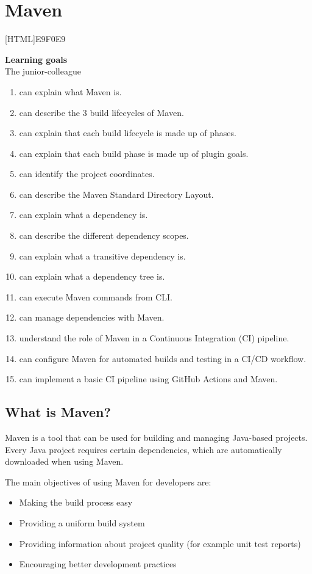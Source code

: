 \chapter{Maven}
\label{chap:maven}

[HTML]{E9F0E9}{\parbox{\textwidth}{%
\noindent \textbf{Learning goals}\\
The junior-colleague
\begin{enumerate}[nolistsep]
\item can explain what Maven is.
\item can describe the 3 build lifecycles of Maven.
\item can explain that each build lifecycle is made up of phases.
\item can explain that each build phase is made up of plugin goals.
\item can identify the project coordinates.
\item can describe the Maven Standard Directory Layout.
\item can explain what a dependency is.
\item can describe the different dependency scopes.
\item can explain what a transitive dependency is.
\item can explain what a dependency tree is.
\item can execute Maven commands from CLI.
\item can manage dependencies with Maven.
\item understand the role of Maven in a Continuous Integration (CI) pipeline.
\item can configure Maven for automated builds and testing in a CI/CD workflow.
\item can implement a basic CI pipeline using GitHub Actions and Maven.
\end{enumerate}}}

\section{What is Maven?}

Maven is a tool that can be used for building and managing Java-based projects.
Every Java project requires certain dependencies, which are automatically downloaded when using Maven.

The main objectives of using Maven for developers are:
\begin{itemize}
\item Making the build process easy
\item Providing a uniform build system
\item Providing information about project quality (for example unit test reports)
\item Encouraging better development practices
\end{itemize}

